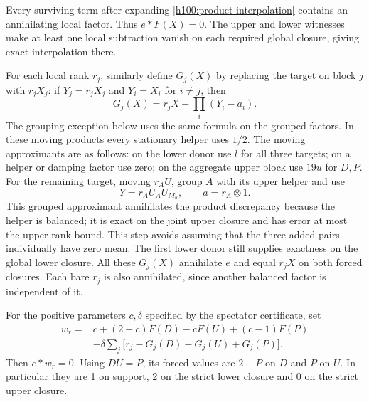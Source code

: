 Every surviving term after expanding \eqref{h100:product-interpolation}
contains an annihilating local factor.  Thus $e*F(X)=0$.  The upper and
lower witnesses make at least one local subtraction vanish on each
required global closure, giving exact interpolation there.

For each local rank $r_j$, similarly define $G_j(X)$ by replacing the
target on block $j$ with $r_jX_j$: if $Y_j=r_jX_j$ and
$Y_i=X_i$ for $i\ne j$, then
\[
 G_j(X)=r_jX-\prod_i(Y_i-a_i).
\]
The grouping exception below uses the same formula on the grouped
factors.  In these moving products every
stationary helper uses $1/2$.  The moving approximants are as follows:
on the lower donor use $l$ for all three targets; on a helper or damping
factor use zero; on the aggregate upper block use $19u$ for $D,P$.
For the remaining target, moving $r_AU$, group $A$ with its upper
helper and use
\[
 Y=r_AU_AU_{M_u},\qquad a=r_A\otimes1.
\]
This grouped approximant annihilates the product discrepancy because
the helper is balanced; it is exact on the joint upper closure and
has error at most the upper rank bound.  This step avoids assuming
that the three added pairs individually have zero mean.  The first
lower donor still supplies exactness on the global lower closure.
All these $G_j(X)$ annihilate $e$ and equal $r_jX$ on both forced
closures.  Each bare $r_j$ is also annihilated, since another balanced
factor is independent of it.

For the positive parameters $c,\delta$ specified by the spectator
certificate, set
\begin{equation}\label{h100:rational-profile}
 \begin{split}
 w_r={}&c+(2-c)F(D)-cF(U)+(c-1)F(P)\\
       &-\delta\sum_j\bigl[r_j-G_j(D)-G_j(U)+G_j(P)\bigr].
 \end{split}
\end{equation}
Then $e*w_r=0$.  Using $DU=P$, its forced values are $2-P$ on $D$ and
$P$ on $U$.  In particular they are 1 on support, 2 on the strict
lower closure and 0 on the strict upper closure.

